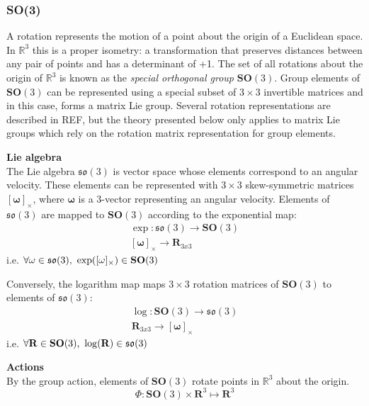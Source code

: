 	\subsubsection{\textbf{SO}(3)}	
		A rotation represents the motion of a point about the origin of a Euclidean space. In $\mathbb{R}^3$ this is a proper isometry: a transformation that preserves distances between any pair of points and has a determinant of +1. The set of all rotations about the origin of $\mathbb{R}^3$ is known as the \textit{special orthogonal group} $\textbf{SO}(3)$.
		Group elements of $\textbf{SO}(3)$ can be represented using a special subset of $3 \times 3$ invertible matrices and in this case, forms a matrix Lie group. Several rotation representations are described in REF, but the theory presented below only applies to matrix Lie groups which rely on the rotation matrix representation for group elements.
		
		\textbf{Lie algebra}\\
		The Lie algebra $\mathfrak{so}(3)$ is vector space whose elements correspond to an angular velocity. These elements can be represented with $3 \times 3$ skew-symmetric matrices $[\bm{\omega}]_{\times}$, where $\bm{\omega}$ is a 3-vector representing an angular velocity.
		Elements of $\mathfrak{so}(3)$ are mapped to $\textbf{SO}(3)$ according to the exponential map:
		\begin{equation}
			\begin{split}
				\exp: \mathfrak{so}(3) \rightarrow \mathbf{SO}(3)\\
				[\bm{\omega}]_\times \rightarrow \mathbf{R}_{3x3}
			\end{split}		
		\end{equation}		
		i.e. $\forall \omega \in \mathfrak{so}(3) \textnormal{, } \exp([\omega]_\times) \in  \mathbf{SO}(3)$
		
		Conversely, the logarithm map maps $3 \times 3$ rotation matrices of $\mathbf{SO}(3)$ to elements of $\mathfrak{so}(3)$:
		\begin{equation}
			\begin{split}
				\log: \mathbf{SO}(3) \rightarrow \mathfrak{so}(3)\\
				 \mathbf{R}_{3x3} \rightarrow [\bm{\omega}]_\times
			\end{split}		
		\end{equation}		
		i.e. $\forall \mathbf{R} \in \mathbf{SO}(3)  \textnormal{, } \log(\mathbf{R}) \in  \mathfrak{so}(3)$
				
		\textbf{Actions}\\
		By the group action, elements of $\mathbf{SO}(3)$ rotate points in $\mathbb{R}^3$ about the origin. 
		\begin{equation}
			\Phi: \mathbf{SO}(3) \times \mathbf{R}^3 \mapsto \mathbf{R}^3
		\end{equation}
		
